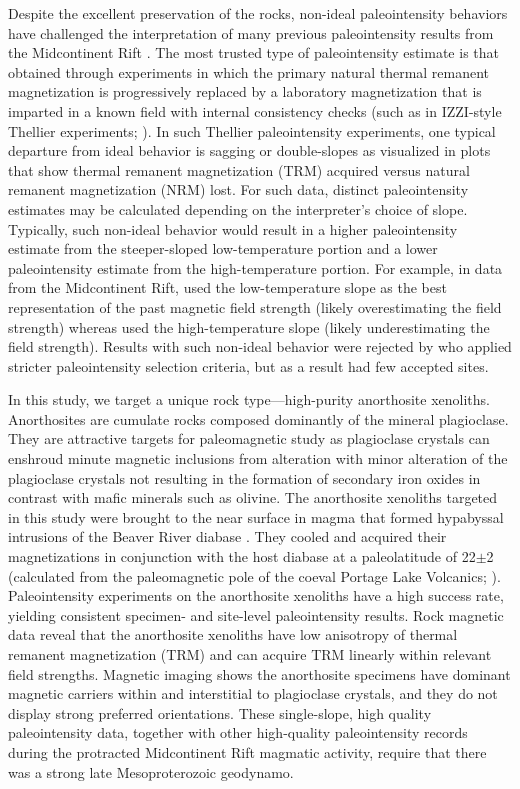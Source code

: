 \documentclass[9pt,twocolumn,twoside,lineno]{pnas-new}
\begin{document}
Despite the excellent preservation of the rocks, non-ideal paleointensity behaviors have challenged the interpretation of many previous paleointensity results from the Midcontinent Rift \cite{Pesonen1983a, Kulakov2013a, Sprain2018a}. The most trusted type of paleointensity estimate is that obtained through experiments in which the primary natural thermal remanent magnetization is progressively replaced by a laboratory magnetization that is imparted in a known field with internal consistency checks (such as in IZZI-style Thellier experiments;  \citealp{Yu2004a}). In such Thellier paleointensity experiments, one typical departure from ideal behavior is sagging or double-slopes as visualized in plots that show thermal remanent magnetization (TRM) acquired versus natural remanent magnetization (NRM) lost. For such data, distinct paleointensity estimates may be calculated depending on the interpreter's choice of slope. Typically, such non-ideal behavior would result in a higher paleointensity estimate from the steeper-sloped low-temperature portion and a lower paleointensity estimate from the high-temperature portion. For example, in data from the Midcontinent Rift,  \citealp{Pesonen1983a} used the low-temperature slope as the best representation of the past magnetic field strength (likely overestimating the field strength) whereas  \citealp{Kulakov2013a} used the high-temperature slope (likely underestimating the field strength). Results with such non-ideal behavior were rejected by \citealp{Sprain2018a} who applied stricter paleointensity selection criteria, but as a result had few accepted sites.

In this study, we target a unique rock type---high-purity anorthosite xenoliths. Anorthosites are cumulate rocks composed dominantly of the mineral plagioclase. They are attractive targets for paleomagnetic study as plagioclase crystals can enshroud minute magnetic inclusions from alteration with minor alteration of the plagioclase crystals not resulting in the formation of secondary iron oxides in contrast with mafic minerals such as olivine. The anorthosite xenoliths targeted in this study were brought to the near surface in magma that formed hypabyssal intrusions of the Beaver River diabase \cite{Zhang2021b}. They cooled and acquired their magnetizations in conjunction with the host diabase at a paleolatitude of 22\textdegree $\pm$2 \textdegree (calculated from the paleomagnetic pole of the coeval Portage Lake Volcanics; \citealp{Swanson-Hysell2019a,Zhang2021b}). Paleointensity experiments on the anorthosite xenoliths have a high success rate, yielding consistent specimen- and site-level paleointensity results. Rock magnetic data reveal that the anorthosite xenoliths have low anisotropy of thermal remanent magnetization (TRM) and can acquire TRM linearly within relevant field strengths. Magnetic imaging shows the anorthosite specimens have dominant magnetic carriers within and interstitial to plagioclase crystals, and they do not display strong preferred orientations. These single-slope, high quality paleointensity data, together with other high-quality paleointensity records during the protracted Midcontinent Rift magmatic activity, require that there was a strong late Mesoproterozoic geodynamo.
\end{document}

